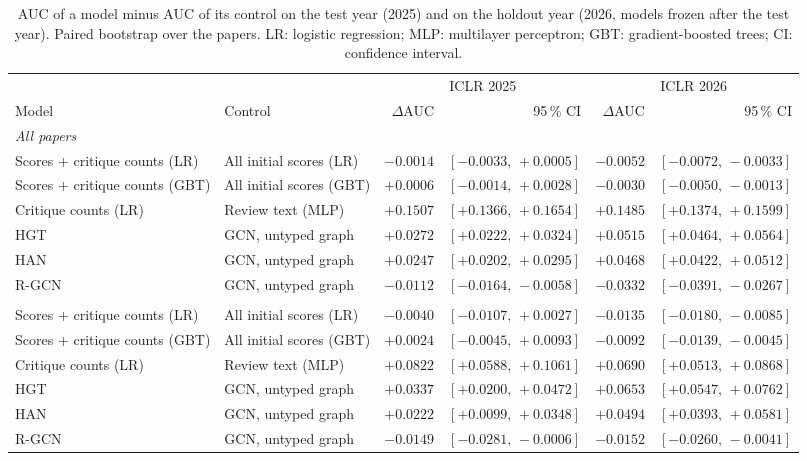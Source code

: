 \begin{table}[t]
\centering
\footnotesize
\setlength{\tabcolsep}{3pt}
\caption{AUC of a model minus AUC of its control on the test year (2025) and on the holdout year (2026, models frozen after the test year). Paired bootstrap over the papers. LR: logistic regression; MLP: multilayer perceptron; GBT: gradient-boosted trees; CI: confidence interval.}
\label{tab:holdout-paired}
\begin{tabular}{@{}llrrrr@{}}
\toprule
 & & \multicolumn{2}{c}{ICLR 2025} & \multicolumn{2}{c}{ICLR 2026} \\
\cmidrule(lr){3-4} \cmidrule(lr){5-6}
Model & Control & $\Delta$AUC & 95\,\% CI & $\Delta$AUC & 95\,\% CI \\
\midrule
\multicolumn{6}{l}{\emph{All papers}} \\
Scores + critique counts (LR) & All initial scores (LR) & $-0.0014$ & $[-0.0033,\,+0.0005]$ & $-0.0052$ & $[-0.0072,\,-0.0033]$ \\
Scores + critique counts (GBT) & All initial scores (GBT) & $+0.0006$ & $[-0.0014,\,+0.0028]$ & $-0.0030$ & $[-0.0050,\,-0.0013]$ \\
Critique counts (LR) & Review text (MLP) & $+0.1507$ & $[+0.1366,\,+0.1654]$ & $+0.1485$ & $[+0.1374,\,+0.1599]$ \\
HGT & GCN, untyped graph & $+0.0272$ & $[+0.0222,\,+0.0324]$ & $+0.0515$ & $[+0.0464,\,+0.0564]$ \\
HAN & GCN, untyped graph & $+0.0247$ & $[+0.0202,\,+0.0295]$ & $+0.0468$ & $[+0.0422,\,+0.0512]$ \\
R-GCN & GCN, untyped graph & $-0.0112$ & $[-0.0164,\,-0.0058]$ & $-0.0332$ & $[-0.0391,\,-0.0267]$ \\
\addlinespace
\multicolumn{6}{l}{\emph{Borderline papers}} \\
Scores + critique counts (LR) & All initial scores (LR) & $-0.0040$ & $[-0.0107,\,+0.0027]$ & $-0.0135$ & $[-0.0180,\,-0.0085]$ \\
Scores + critique counts (GBT) & All initial scores (GBT) & $+0.0024$ & $[-0.0045,\,+0.0093]$ & $-0.0092$ & $[-0.0139,\,-0.0045]$ \\
Critique counts (LR) & Review text (MLP) & $+0.0822$ & $[+0.0588,\,+0.1061]$ & $+0.0690$ & $[+0.0513,\,+0.0868]$ \\
HGT & GCN, untyped graph & $+0.0337$ & $[+0.0200,\,+0.0472]$ & $+0.0653$ & $[+0.0547,\,+0.0762]$ \\
HAN & GCN, untyped graph & $+0.0222$ & $[+0.0099,\,+0.0348]$ & $+0.0494$ & $[+0.0393,\,+0.0581]$ \\
R-GCN & GCN, untyped graph & $-0.0149$ & $[-0.0281,\,-0.0006]$ & $-0.0152$ & $[-0.0260,\,-0.0041]$ \\
\bottomrule
\end{tabular}
\end{table}
